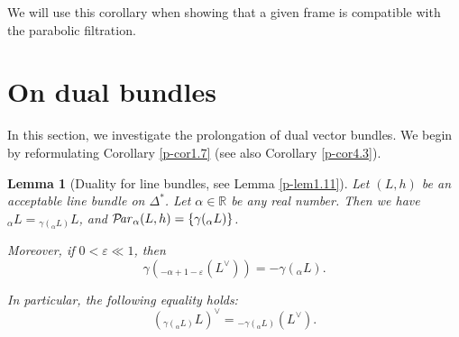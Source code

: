 \documentclass[12pt,twoside]{amsart}
\DeclareMathOperator{\Par}{\mathcal{P}\!\it{ar}}
\newtheorem{lem}[thm]{Lemma}
\theoremstyle{definition}
\begin{document}
We will use this corollary when 
showing that a given frame is compatible with the parabolic filtration.

\section{On dual bundles}\label{p-sec13}

In this section, we investigate the prolongation of dual vector bundles. 
We begin by reformulating Corollary \ref{p-cor1.7} (see also Corollary \ref{p-cor4.3}).

\begin{lem}[Duality for line bundles, 
see Lemma \ref{p-lem1.11}]\label{p-lem13.1}
Let $(L, h)$ be an acceptable line bundle on $\Delta^*$.  
Let $\alpha \in \mathbb{R}$ be any real number.  
Then we have ${}_\alpha L = {}_{\gamma({}_\alpha L)} L$, 
and $\Par_\alpha (L, h) = \{ \gamma({}_\alpha L) \}$.   

Moreover, if $0 < \varepsilon \ll 1$, then  
\[
\gamma({}_{-\alpha + 1 - \varepsilon}(L^\vee)) = -\gamma({}_\alpha L).
\]  

In particular, the following equality holds:
\[
\left({}_{\gamma({}_\alpha L)} L\right)^\vee = {}_{-\gamma({}_\alpha L)}(L^\vee).
\]
\end{lem}
\end{document}
